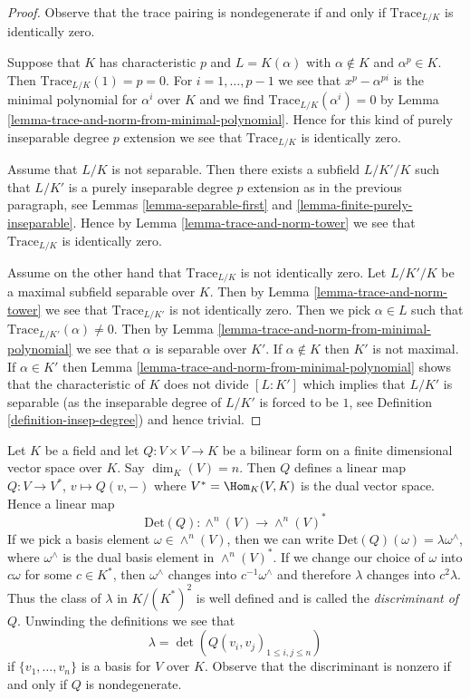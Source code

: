 \begin{proof}
Observe that the trace pairing is nondegenerate if and only if
$\text{Trace}_{L/K}$ is identically zero.

\medskip\noindent
Suppose that $K$ has characteristic $p$ and $L = K(\alpha)$ with
$\alpha \not \in K$ and $\alpha^p \in K$. Then $\text{Trace}_{L/K}(1) = p = 0$.
For $i = 1, \ldots, p - 1$ we see that $x^p - \alpha^{pi}$ is the minimal
polynomial for $\alpha^i$ over $K$ and we find
$\text{Trace}_{L/K}(\alpha^i) = 0$ by
Lemma \ref{lemma-trace-and-norm-from-minimal-polynomial}.
Hence for this kind of purely inseparable degree $p$ extension
we see that $\text{Trace}_{L/K}$ is identically zero.

\medskip\noindent
Assume that $L/K$ is not separable. Then there exists a subfield
$L/K'/K$ such that $L/K'$ is a purely inseparable degree $p$ extension
as in the previous paragraph, see
Lemmas \ref{lemma-separable-first} and \ref{lemma-finite-purely-inseparable}.
Hence by Lemma \ref{lemma-trace-and-norm-tower}
we see that $\text{Trace}_{L/K}$ is identically zero.

\medskip\noindent
Assume on the other hand that $\text{Trace}_{L/K}$ is not identically zero.
Let $L/K'/K$ be a maximal subfield separable over $K$. Then by
Lemma \ref{lemma-trace-and-norm-tower}
we see that $\text{Trace}_{L/K'}$ is not identically zero.
Then we pick $\alpha \in L$ such that
$\text{Trace}_{L/K'}(\alpha) \not = 0$.
Then by Lemma \ref{lemma-trace-and-norm-from-minimal-polynomial}
we see that $\alpha$ is separable over $K'$. If $\alpha \not \in K$
then $K'$ is not maximal. If $\alpha \in K'$ then
Lemma \ref{lemma-trace-and-norm-from-minimal-polynomial}
shows that the characteristic of $K$ does not divide $[L : K']$
which implies that $L/K'$ is separable
(as the inseparable degree of $L/K'$ is forced to be $1$,
see Definition \ref{definition-insep-degree})
and hence trivial.
\end{proof}

\noindent
Let $K$ be a field and let $Q : V \times V \to K$ be a bilinear form
on a finite dimensional vector space over $K$. Say $\dim_K(V) = n$.
Then $Q$ defines a linear map $Q : V \to V^*$, $v \mapsto Q(v, -)$
where $V^* = \Hom_K(V, K)$ is the dual vector space. Hence a linear map
$$
\text{Det}(Q) : \wedge^n(V) \longrightarrow \wedge^n(V)^*
$$
If we pick a basis element $\omega \in \wedge^n(V)$, then we can
write $\text{Det}(Q)(\omega) = \lambda \omega^\wedge$, where $\omega^\wedge$
is the dual basis element in $\wedge^n(V)^*$. If we change our
choice of $\omega$ into $c \omega$ for some $c \in K^*$, then
$\omega^\wedge$ changes into $c^{-1} \omega^\wedge$ and therefore
$\lambda$ changes into $c^2 \lambda$. Thus the class of
$\lambda$ in $K/(K^*)^2$ is well defined and is called the
{\it discriminant of $Q$}. Unwinding the definitions we see that
$$
\lambda = \det(Q(v_i, v_j)_{1 \leq i, j \leq n})
$$
if $\{v_1, \ldots, v_n\}$ is a basis for $V$ over $K$. Observe that
the discriminant is nonzero if and only if $Q$ is nondegenerate.

